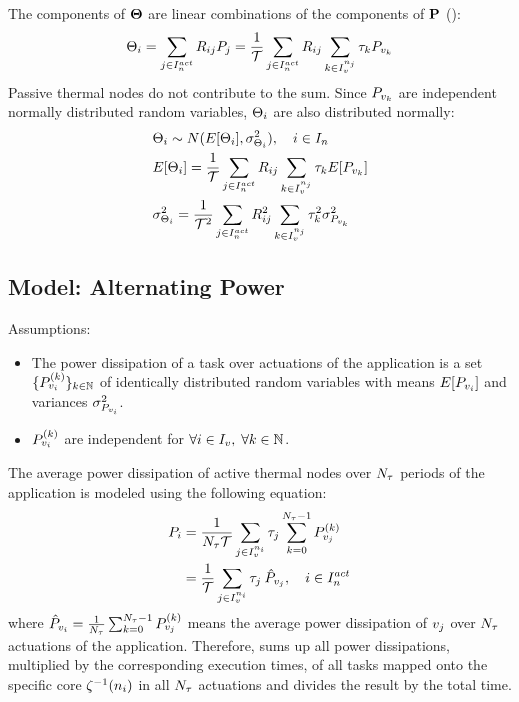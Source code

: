 The components of $\mathbf{\Theta}$ are linear combinations of the components of $\mathbf{P}$ ():
\[
  \Theta_i = \sum_{j \in I_n^{act}} R_{ij} P_j = \frac{1}{\mathcal{T}} \sum_{j \in I_n^{act}} R_{ij} \sum_{k \in I_v^{n_j}} \tau_k P_{v_k}
\]
Passive thermal nodes do not contribute to the sum. Since $P_{v_k}$ are independent normally distributed random variables, $\Theta_i$ are also distributed normally:
\begin{align*}
  & \Theta_i \sim N(E[\Theta_i], \sigma_{\Theta_i}^2), \hspace{10pt} i \in I_n \\
  & E[\Theta_i] = \frac{1}{\mathcal{T}} \sum_{j \in I_n^{act}} R_{ij} \sum_{k \in I_v^{n_j}} \tau_k E[P_{v_k}] \\
  & \sigma_{\Theta_i}^2 = \frac{1}{\mathcal{T}^2} \sum_{j \in I_n^{act}} R^2_{ij} \sum_{k \in I_v^{n_j}} \tau_k^2 \sigma_{P_{v_k}}^2
\end{align*}

\subsection{Model: Alternating Power} 
Assumptions:
\begin{itemize}
  \item The power dissipation of a task over actuations of the application is a set $\{ P^{(k)}_{v_i} \}_{k \in \mathbb{N}}$ of identically distributed random variables with means $E[P_{v_i}]$ and variances $\sigma_{P_{v_i}}^2$.
  \item $P^{(k)}_{v_i}$ are independent for $\forall i \in I_v, \; \forall k \in \mathbb{N}$.
\end{itemize}

The average power dissipation of active thermal nodes over $N_{\tau}$ periods of the application is modeled using the following equation:
\begin{align}
  \power_i & = \frac{1}{\periodcount \period} \sum_{j \in \taskindex^{\node_i}} \executiontime_j \sum_{k = 0}^{\periodcount - 1} \power^{(k)}_{\task_j} \nonumber \\
  & = \frac{1}{\period} \sum_{j \in \taskindex^{\node_i}} \executiontime_j \: \a{\power}_{\task_j}, \sep i \in \nodeindexactive \equlabel{node-average-power}
\end{align}
where $\hat{P}_{v_i} = \frac{1}{N_{\tau}} \sum_{k = 0}^{N_{\tau} - 1} P^{(k)}_{v_j}$ means the average power dissipation of $v_j$ over $N_{\tau}$ actuations of the application. Therefore,  sums up all power dissipations, multiplied by the corresponding execution times, of all tasks mapped onto the specific core $\zeta^{-1}(n_i)$ in all $N_{\tau}$ actuations and divides the result by the total time.

